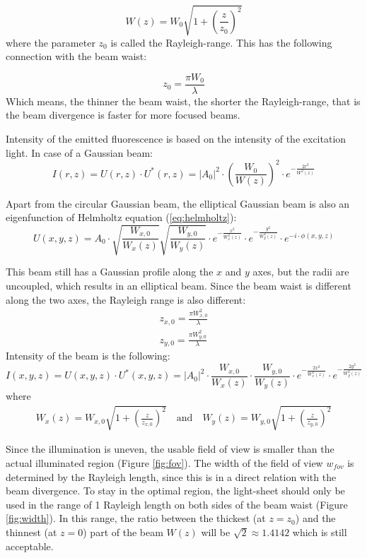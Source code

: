 \documentclass{diploma_style}
\begin{document}
\begin{equation}
	W(z) = W_0\sqrt{1+\left( \frac{z}{z_0} \right)^2}
\end{equation}
where the parameter $z_0$ is called the Rayleigh-range. This has the following connection with the beam waist:

\begin{equation}
	z_0 = \frac{\pi W_0}{\lambda}
\end{equation}
Which means, the thinner the beam waist, the shorter the Rayleigh-range, that is the beam divergence is faster for more focused beams.

Intensity of the emitted fluorescence is based on the intensity of the excitation light. In case of a Gaussian beam:
\begin{equation}
	I(r,z) = U(r,z)\cdot U^*(r,z) = |A_0|^2 \cdot \left( \frac{W_0}{W(z)}\right)^2 \cdot e^{-\frac{2r^2}{W^2(z)}}
\end{equation}

Apart from the circular Gaussian beam, the elliptical Gaussian beam is also an eigenfunction of Helmholtz equation (\ref{eq:helmholtz}):
\begin{equation}
	U(x,y,z) = A_0 \cdot \sqrt{\frac{W_{x,0}}{W_x(z)}} \sqrt{\frac{W_{y,0}}{W_y(z)}} \cdot e^{-\frac{x^2}{W_x^2(z)}} \cdot e^{-\frac{y^2}{W_y^2(z)}} \cdot e^{-i\cdot \phi(x,y,z)}
\end{equation}

This beam still has a Gaussian profile along the $x$ and $y$ axes, but the radii are uncoupled, which results in an elliptical beam. Since the beam waist is different along the two axes, the Rayleigh range is also different:
\begin{align}
	z_{x,0} = \frac{\pi W_{x,0}^2}{\lambda} \\
	z_{y,0} = \frac{\pi W_{y,0}^2}{\lambda}
\end{align}
Intensity of the beam is the following:
\begin{equation}
	I(x,y,z) = U(x,y,z)\cdot U^*(x,y,z) = |A_0|^2 \cdot \frac{W_{x,0}}{W_x(z)} \cdot \frac{W_{y,0}}{W_y(z)} \cdot e^{-\frac{2x^2}{W_x^2(z)}} \cdot e^{-\frac{2y^2}{W_y^2(z)}}
\end{equation}
where
\begin{align}
W_x(z) = W_{x,0}\sqrt{1+\left( \frac{z}{z_{x,0}} \right)^2}\mathrm{\quad and \quad } W_y(z) = W_{y,0}\sqrt{1+\left( \frac{z}{z_{y,0}} \right)^2}
\end{align}

Since the illumination is uneven, the usable field of view is smaller than the actual illuminated region (Figure \ref{fig:fov}). The width of the field of view $w_{fov}$ is determined by the Rayleigh length, since this is in a direct relation with the beam divergence. To stay in the optimal region, the light-sheet should only be used in the range of 1 Rayleigh length on both sides of the beam waist (Figure \ref{fig:width}). In this range, the ratio between the thickest (at $z=z_0$) and the thinnest (at $z=0$) part of the beam $W(z)$ will be $\sqrt{2}\approx 1.4142$ which is still acceptable.
\end{document}
